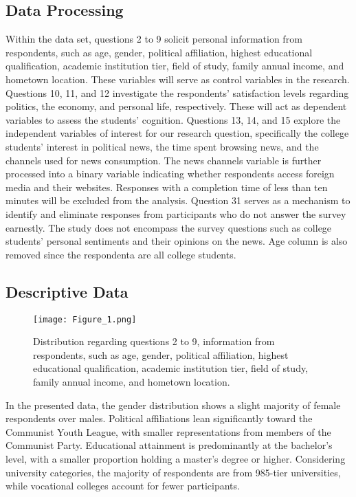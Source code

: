 \documentclass{article}
\begin{document}
\subsection{Data Processing}
Within the data set, questions 2 to 9 solicit personal information from respondents, such as age, gender, political affiliation, highest educational qualification, academic institution tier, field of study, family annual income, and hometown location. These variables will serve as control variables in the research. Questions 10, 11, and 12 investigate the respondents' satisfaction levels regarding politics, the economy, and personal life, respectively. These will act as dependent variables to assess the students' cognition. Questions 13, 14, and 15 explore the independent variables of interest for our research question, specifically the college students' interest in political news, the time spent browsing news, and the channels used for news consumption. The news channels variable is further processed into a binary variable indicating whether respondents access foreign media and their websites. Responses with a completion time of less than ten minutes will be excluded from the analysis. Question 31 serves as a mechanism to identify and eliminate responses from participants who do not answer the survey earnestly. The study does not encompass the survey questions such as college students' personal sentiments and their opinions on the news. Age column is also  removed since the respondenta are all college students.
\subsection{Descriptive Data}
\begin{figure}[H]
\centering
\texttt{[image: Figure\_1.png]}
\caption{Distribution regarding questions 2 to 9, information from respondents, such as age, gender, political affiliation, highest educational qualification, academic institution tier, field of study, family annual income, and hometown location. }
\label{fig:Control Variables}
\end{figure}
In the presented data, the gender distribution shows a slight majority of female respondents over males. Political affiliations lean significantly toward the Communist Youth League, with smaller representations from members of the Communist Party. Educational attainment is predominantly at the bachelor's level, with a smaller proportion holding a master's degree or higher. Considering university categories, the majority of respondents are from 985-tier universities, while vocational colleges account for fewer participants.
\end{document}

